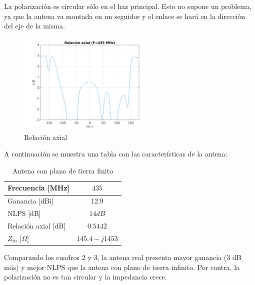 \documentclass[12pt]{article}
\begin{document}
La polarización es circular sólo en el haz principal. Esto no supone un problema, ya que la antena va montada en un seguidor y el enlace se hará en la dirección del eje de la misma.\\

\begin{figure}[H]
	\centering
	\includegraphics[width=0.6\textwidth]{helix_2_F435_AR.png}
	\caption{Relación axial}
\end{figure}

\newpage
A continuación se muestra una tabla con las características de la antena:\\

\begin{table}[!h]
	\centering
	\begin{tabular}{lc}
		\hline 
		Frecuencia [MHz] & $435$ \\ 
		\hline 
		Ganancia [dBi] & $12.9$ \\ 
		\hline 
		NLPS [dB] & $14 dB$ \\ 
		\hline 
		Relación axial [dB] & $0.5442$ \\ 
		\hline 
		$Z_{in}$ [$\Omega$] & $145.4 - j1453$ \\ 
		\hline 
	\end{tabular} 
	\caption{Antena con plano de tierra finito}
\end{table} 

Comparando los cuadros 2 y 3, la antena real presenta mayor ganancia (3 dB más) y mejor NLPS que la antena con plano de tierra infinito. Por contra, la polarización no es tan circular y la impedancia crece.

\newpage
\end{document}
